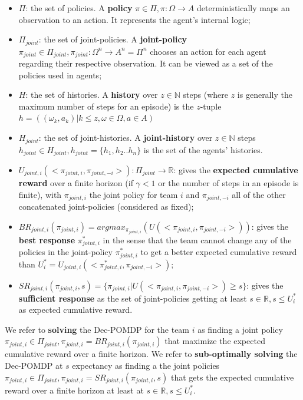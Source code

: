 \documentclass[pdflatex,sn-mathphys-num]{sn-jnl}%
\theoremstyle{thmstyleone}%
\theoremstyle{thmstyletwo}%
\theoremstyle{thmstylethree}%
\begin{document}
\begin{itemize}

    \item $\Pi$: the set of policies. A \textbf{policy} $\pi \in \Pi, \pi: \Omega \rightarrow A$ deterministically maps an observation to an action. It represents the agent's internal logic;
    \item $\Pi_{joint}$: the set of joint-policies. A \textbf{joint-policy} $\pi_{joint} \in \Pi_{joint}, \pi_{joint}: \Omega^n \rightarrow A^n = \Pi^n$ chooses an action for each agent regarding their respective observation. It can be viewed as a set of the policies used in agents;
    \item $H$: the set of histories. A \textbf{history} over $z \in \mathbb{N}$ steps (where $z$ is generally the maximum number of steps for an episode) is the $z$-tuple $h = ((\omega_{k}, a_{k}) | k \leq z, \omega \in \Omega, a \in A)$
    \item $H_{joint}$: the set of joint-histories. A \textbf{joint-history} over $z \in \mathbb{N}$ steps $h_{joint} \in H_{joint}, h_{joint} = \{h_1,h_2..h_n\}$ is the set of the agents' histories.
    \item $U_{joint,i}(<\pi_{joint,i}, \pi_{joint,-i}>): \Pi_{joint} \rightarrow \mathbb{R}$: gives the \textbf{expected cumulative reward} over a finite horizon (if $\gamma < 1$ or the number of steps in an episode is finite), with $\pi_{joint,i}$ the joint policy for team $i$ and $\pi_{joint,-i}$ all of the other concatenated joint-policies (considered as fixed);
    \item $BR_{joint,i}(\pi_{joint,i}) = argmax_{\pi_{joint,i}}(U(<\pi_{joint,i},\pi_{joint,-i}>))$: gives the \textbf{best response} $\pi_{joint,i}^*$ in the sense that the team cannot change any of the policies in the joint-policy $\pi_{joint,i}^*$ to get a better expected cumulative reward than $U_i^* = U_{joint,i}(<\pi_{joint,i}^*, \pi_{joint,-i}>)$;
    \item $SR_{joint,i}(\pi_{joint,i}, s) = \{\pi_{joint,i} | U(<\pi_{joint,i},\pi_{joint,-i}>) \geq s\}$: gives the \textbf{sufficient response} as the set of joint-policies getting at least $s \in \mathbb{R}, s \leq U_i^*$ as expected cumulative reward.
\end{itemize}

We refer to \textbf{solving} the Dec-POMDP for the team $i$ as finding a joint policy $\pi_{joint,i} \in \Pi_{joint}, \pi_{joint,i} = BR_{joint,i}(\pi_{joint,i})$ that maximize the expected cumulative reward over a finite horizon.
We refer to \textbf{sub-optimally solving} the Dec-POMDP at $s$ expectancy as finding a the joint policies $\pi_{joint,i} \in \Pi_{joint}, \pi_{joint,i} = SR_{joint,i}(\pi_{joint,i}, s)$ that gets the expected cumulative reward over a finite horizon at least at $s \in \mathbb{R}, s \leq U_i^*$.
\end{document}
